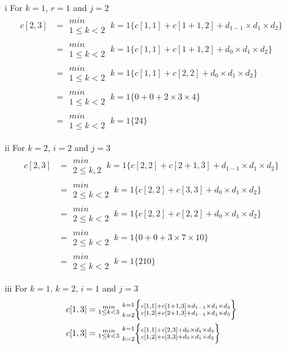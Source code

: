 \documentclass[12pt]{report}
\begin{document}
\begin{enumerate}
	\item[i] For $k=1$, $r =1$ and $j = 2$
	\begin{align*}
		c[2,3] &= \substack{min\\{1\le k < 2}}~k=1\bigg\{ c[1,1] + c[1+1,2] + d_{1-1} \times d_1\times d_2\bigg\}\\
		&= \substack{min\\{1\le k < 2}}~k=1\bigg\{ c[1,1] + c[1+1,2] + d_{0} \times d_1\times d_2\bigg\}\\
		&= \substack{min\\{1\le k < 2}}~k=1\bigg\{ c[1,1] + c[2,2] + d_{0} \times d_1\times d_2\bigg\}\\
		&= \substack{min\\{1\le k < 2}}~k=1\bigg\{ 0+0 + 2 \times 3\times 4\bigg\}\\
		&= \substack{min\\{1\le k < 2}}~k=1\bigg\{24\bigg\}
	\end{align*}
	\item[ii] For $k = 2$, $i = 2$ and $j = 3$
	\begin{align*}
		c[2,3] &= \substack{min\\{2\le k , 2}}~k=1\bigg\{ c[2,2] + c[2+1,3] + d_{1-1} \times d_1\times d_2\bigg\}\\
		&= \substack{min\\{2\le k < 2}}~k=1\bigg\{ c[2,2] + c[3,3] + d_{0} \times d_1\times d_2\bigg\}\\
		&= \substack{min\\{2\le k < 2}}~k=1\bigg\{ c[2,2] + c[2,2] + d_{0} \times d_1\times d_2\bigg\}\\
		&= \substack{min\\{2\le k < 2}}~k=1\bigg\{ 0+0 + 3 \times 7\times 10\bigg\}\\
		&= \substack{min\\{2\le k < 2}}~k=1\bigg\{210\bigg\}
	\end{align*}
	\item[iii] For $k=1$, $k=2$, $i = 1$ and $j=3$
	\begin{align*}
		\Huge c[1,3] &= \substack{min\\{1\le k < 3}}\substack{~k=1\\\\~k=2}\bigg\{\substack{{c[1,1] + c[1+1,3] + d_{1-1} \times d_1\times d_3}\\{c[1,2] + c[2+1,3] + d_{1-1} \times d_1\times d_3}}\bigg\}\\
		c[1,3] &= \substack{min\\{1\le k < 3}}\substack{~k=1\\\\~k=2}\bigg\{\substack{{c[1,1] + c[2,3] + d_{0} \times d_1\times d_3}\\{c[1,2] + c[3,3] + d_{0} \times d_1\times d_3}}\bigg\}\\

\end{align*}
\end{enumerate}
\end{document}
